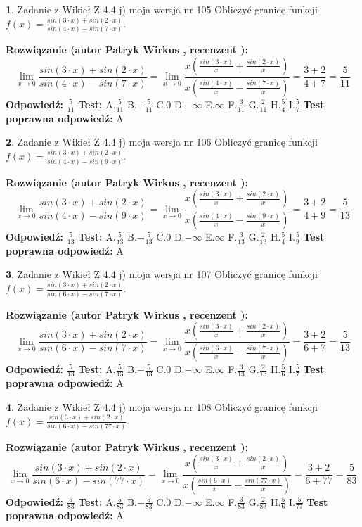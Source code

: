 \documentclass[12pt, a4paper]{article}
\theoremstyle{definition} %
\newtheorem{zad}{}
\newcommand{\zadStart}[1]{\begin{zad}#1\newline}
\newcommand{\zadStop}{\end{zad}}
\newcommand{\rozwStart}[2]{\noindent \textbf{Rozwiązanie (autor #1 , recenzent #2): }\newline}
\newcommand{\rozwStop}{\newline}
\newcommand{\odpStart}{\noindent \textbf{Odpowiedź:}\newline}
\newcommand{\odpStop}{\newline}
\newcommand{\testStart}{\noindent \textbf{Test:}\newline}
\newcommand{\testStop}{\newline}
\newcommand{\kluczStart}{\noindent \textbf{Test poprawna odpowiedź:}\newline}
\newcommand{\kluczStop}{\newline}
\begin{document}
\zadStart{Zadanie z Wikieł Z 4.4 j) moja wersja nr 105}
Obliczyć granicę funkcji $f(x)=\frac{sin(3\cdot x) +sin(2\cdot x)}{sin(4\cdot x) -sin(7\cdot x)}$.
\zadStop
\rozwStart{Patryk Wirkus}{}
$$\lim\limits_{x\to 0}\frac{sin(3\cdot x) +sin(2\cdot x)}{sin(4\cdot x) -sin(7\cdot x)}=\lim\limits_{x\to 0}\frac{x(\frac{sin(3\cdot x)}{x}+\frac{sin(2\cdot x)}{x})}{x(\frac{sin(4\cdot x)}{x}-\frac{sin(7\cdot x)}{x})}=\frac{3+2}{4+7} = \frac{5}{11}$$
\rozwStop
\odpStart
$\frac{5}{11}$
\odpStop
\testStart
A.$\frac{5}{11}$
B.$-\frac{5}{11}$
C.$0$
D.$-\infty$
E.$\infty$
F.$\frac{3}{11}$
G.$\frac{2}{11}$
H.$\frac{5}{4}$
I.$\frac{5}{7}$
\testStop
\kluczStart
A
\kluczStop



\zadStart{Zadanie z Wikieł Z 4.4 j) moja wersja nr 106}
Obliczyć granicę funkcji $f(x)=\frac{sin(3\cdot x) +sin(2\cdot x)}{sin(4\cdot x) -sin(9\cdot x)}$.
\zadStop
\rozwStart{Patryk Wirkus}{}
$$\lim\limits_{x\to 0}\frac{sin(3\cdot x) +sin(2\cdot x)}{sin(4\cdot x) -sin(9\cdot x)}=\lim\limits_{x\to 0}\frac{x(\frac{sin(3\cdot x)}{x}+\frac{sin(2\cdot x)}{x})}{x(\frac{sin(4\cdot x)}{x}-\frac{sin(9\cdot x)}{x})}=\frac{3+2}{4+9} = \frac{5}{13}$$
\rozwStop
\odpStart
$\frac{5}{13}$
\odpStop
\testStart
A.$\frac{5}{13}$
B.$-\frac{5}{13}$
C.$0$
D.$-\infty$
E.$\infty$
F.$\frac{3}{13}$
G.$\frac{2}{13}$
H.$\frac{5}{4}$
I.$\frac{5}{9}$
\testStop
\kluczStart
A
\kluczStop



\zadStart{Zadanie z Wikieł Z 4.4 j) moja wersja nr 107}
Obliczyć granicę funkcji $f(x)=\frac{sin(3\cdot x) +sin(2\cdot x)}{sin(6\cdot x) -sin(7\cdot x)}$.
\zadStop
\rozwStart{Patryk Wirkus}{}
$$\lim\limits_{x\to 0}\frac{sin(3\cdot x) +sin(2\cdot x)}{sin(6\cdot x) -sin(7\cdot x)}=\lim\limits_{x\to 0}\frac{x(\frac{sin(3\cdot x)}{x}+\frac{sin(2\cdot x)}{x})}{x(\frac{sin(6\cdot x)}{x}-\frac{sin(7\cdot x)}{x})}=\frac{3+2}{6+7} = \frac{5}{13}$$
\rozwStop
\odpStart
$\frac{5}{13}$
\odpStop
\testStart
A.$\frac{5}{13}$
B.$-\frac{5}{13}$
C.$0$
D.$-\infty$
E.$\infty$
F.$\frac{3}{13}$
G.$\frac{2}{13}$
H.$\frac{5}{6}$
I.$\frac{5}{7}$
\testStop
\kluczStart
A
\kluczStop



\zadStart{Zadanie z Wikieł Z 4.4 j) moja wersja nr 108}
Obliczyć granicę funkcji $f(x)=\frac{sin(3\cdot x) +sin(2\cdot x)}{sin(6\cdot x) -sin(77\cdot x)}$.
\zadStop
\rozwStart{Patryk Wirkus}{}
$$\lim\limits_{x\to 0}\frac{sin(3\cdot x) +sin(2\cdot x)}{sin(6\cdot x) -sin(77\cdot x)}=\lim\limits_{x\to 0}\frac{x(\frac{sin(3\cdot x)}{x}+\frac{sin(2\cdot x)}{x})}{x(\frac{sin(6\cdot x)}{x}-\frac{sin(77\cdot x)}{x})}=\frac{3+2}{6+77} = \frac{5}{83}$$
\rozwStop
\odpStart
$\frac{5}{83}$
\odpStop
\testStart
A.$\frac{5}{83}$
B.$-\frac{5}{83}$
C.$0$
D.$-\infty$
E.$\infty$
F.$\frac{3}{83}$
G.$\frac{2}{83}$
H.$\frac{5}{6}$
I.$\frac{5}{77}$
\testStop
\kluczStart
A
\kluczStop
\end{document}
